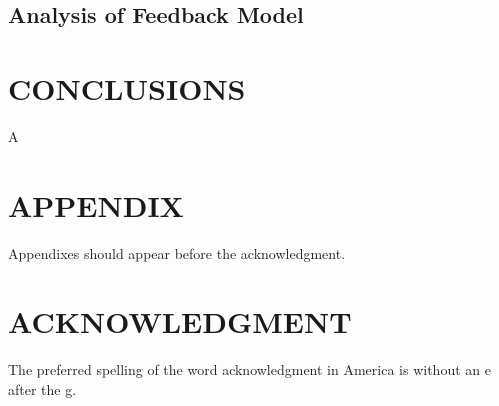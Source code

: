 \documentclass[letterpaper, 10 pt, conference]{ieeeconf}  %
\begin{document}
\subsection{Analysis of Feedback Model}


\section{CONCLUSIONS}

A 

\addtolength{\textheight}{-12cm}   %







\section*{APPENDIX}

Appendixes should appear before the acknowledgment.

\section*{ACKNOWLEDGMENT}

The preferred spelling of the word acknowledgment in America is without an e after the g.
\end{document}
